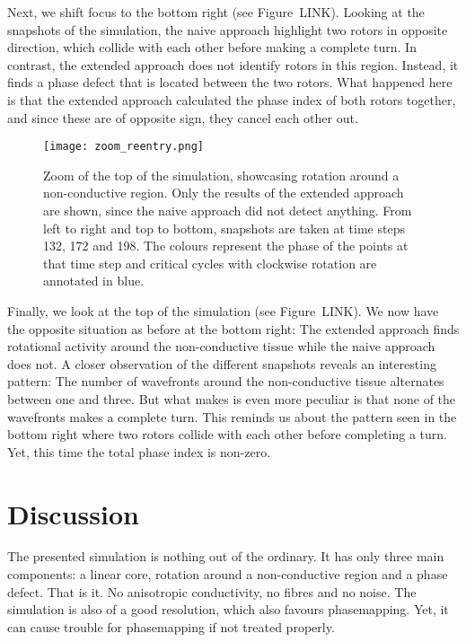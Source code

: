 \documentclass[twocolumn]{article}
\begin{document}
Next, we shift focus to the bottom right (see
Figure~LINK). Looking at the snapshots of the simulation,
the naive approach highlight two rotors in opposite direction, which
collide with each other before making a complete turn. In contrast, the
extended approach does not identify rotors in this region. Instead, it
finds a phase defect that is located between the two rotors. What
happened here is that the extended approach calculated the phase index
of both rotors together, and since these are of opposite sign, they
cancel each other out.

\begin{figure}
\centering
\texttt{[image: zoom\_reentry.png]}
\caption{Zoom of the top of the simulation, showcasing rotation around a
non-conductive region. Only the results of the extended approach are
shown, since the naive approach did not detect anything. From left to
right and top to bottom, snapshots are taken at time steps 132, 172 and
198. The colours represent the phase of the points at that time step and
critical cycles with clockwise rotation are annotated in blue.}
\end{figure}

Finally, we look at the top of the simulation (see
Figure~LINK). We now have the opposite situation as
before at the bottom right: The extended approach finds rotational
activity around the non-conductive tissue while the naive approach does
not. A closer observation of the different snapshots reveals an
interesting pattern: The number of wavefronts around the non-conductive
tissue alternates between one and three. But what makes is even more
peculiar is that none of the wavefronts makes a complete turn. This
reminds us about the pattern seen in the bottom right where two rotors
collide with each other before completing a turn. Yet, this time the
total phase index is non-zero.

\section{Discussion}\label{discussion}

The presented simulation is nothing out of the ordinary. It has only
three main components: a linear core, rotation around a non-conductive
region and a phase defect. That is it. No anisotropic conductivity, no
fibres and no noise. The simulation is also of a good resolution, which
also favours phasemapping. Yet, it can cause trouble for phasemapping if
not treated properly.
\end{document}
